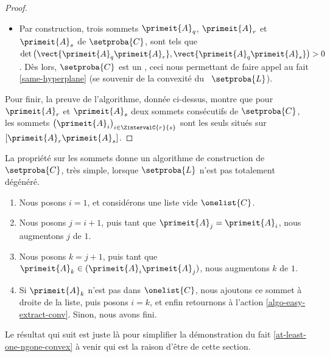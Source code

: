 \begin{proof}
\begin{itemize}
        \item Par construction, trois sommets  $\primeit{A}_q$, $\primeit{A}_r$ et $\primeit{A}_s$ de $\setproba{C}$, sont tels que $\det \big( \vect{\primeit{A}_q \primeit{A}_{r}}, \vect{\primeit{A}_q \primeit{A}_s} \big) > 0$.
        Dès lors, $\setproba{C}$ est un \kgone, ceci nous permettant de faire appel au fait \ref{same-hyperplane} (se souvenir de la convexité du \ncycle\ $\setproba{L}$).
    \end{itemize}


    Pour finir, la preuve de l'algorithme, donnée ci-dessus, montre que pour $\primeit{A}_r$ et $\primeit{A}_s$ deux sommets consécutifs de $\setproba{C}$, les sommets $\big( \primeit{A}_i \big)_{ i \in \ZintervalC{r}{s} }$ sont les seuls situés sur $[\primeit{A}_r \primeit{A}_s]$.
\end{proof}


\begin{remark}
    La propriété sur les sommets donne un algorithme de construction de $\setproba{C}$, très simple, lorsque $\setproba{L}$ n'est pas totalement dégénéré.
    \begin{enumerate}[label=\fbox{\small\bfseries\textsf{A\kern.25pt\arabic*}}]
        \item Nous posons $i = 1$, et considérons une liste vide $\onelist{C}$.

        \item \label{algo-easy-extract-conv}
              Nous posons $j = i + 1$,
              puis
              tant que $\primeit{A}_j = \primeit{A}_i$, nous augmentons $j$ de $1$.

        \item Nous posons $k = j + 1$,
              puis
              tant que $\primeit{A}_k \in (\primeit{A}_i \primeit{A}_j)$, nous augmentons $k$ de $1$.

        \item Si $\primeit{A}_k$ n'est pas dans $\onelist{C}$, nous ajoutons ce sommet à droite de la liste, puis posons $i = k$, et enfin retournons à l'action \ref{algo-easy-extract-conv}. Sinon, nous avons fini.
    \end{enumerate}
\end{remark}




%

Le résultat qui suit est juste là pour simplifier la démonstration du fait \ref{at-least-one-ngone-convex} à venir qui est la raison d'être de cette section.


